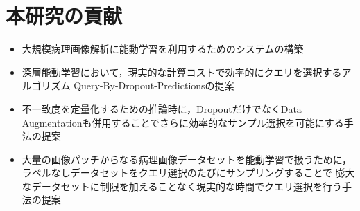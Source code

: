 \section{本研究の貢献}
\begin{itemize}
    \item 大規模病理画像解析に能動学習を利用するためのシステムの構築
    \item 深層能動学習において，現実的な計算コストで効率的にクエリを選択するアルゴリズム Query-By-Dropout-Predictionsの提案
    \item 不一致度を定量化するための推論時に，DropoutだけでなくData Augmentationも併用することでさらに効率的なサンプル選択を可能にする手法の提案
    \item 大量の画像パッチからなる病理画像データセットを能動学習で扱うために，ラベルなしデータセットをクエリ選択のたびにサンプリングすることで
    膨大なデータセットに制限を加えることなく現実的な時間でクエリ選択を行う手法の提案
\end{itemize}

